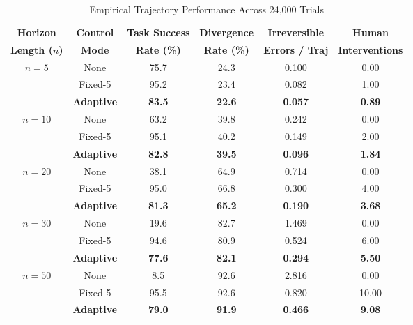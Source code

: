 \documentclass[conference]{IEEEtran}
\begin{document}
\begin{table}[h]
\caption{Empirical Trajectory Performance Across 24,000 Trials}
\label{tab:empirical_results}
\centering
\scriptsize
\renewcommand{\arraystretch}{1.15}
\begin{tabular}{cccccc}
\toprule
\textbf{Horizon} & \textbf{Control} & \textbf{Task Success} & \textbf{Divergence} & \textbf{Irreversible} & \textbf{Human} \\
\textbf{Length ($n$)} & \textbf{Mode} & \textbf{Rate (\%)} & \textbf{Rate (\%)} & \textbf{Errors / Traj} & \textbf{Interventions} \\
\midrule
\multirow{3}{*}{$n = 5$} & None & 75.7 & 24.3 & 0.100 & 0.00 \\
 & Fixed-5 & 95.2 & 23.4 & 0.082 & 1.00 \\
 & \textbf{Adaptive} & \textbf{83.5} & \textbf{22.6} & \textbf{0.057} & \textbf{0.89} \\
\midrule
\multirow{3}{*}{$n = 10$} & None & 63.2 & 39.8 & 0.242 & 0.00 \\
 & Fixed-5 & 95.1 & 40.2 & 0.149 & 2.00 \\
 & \textbf{Adaptive} & \textbf{82.8} & \textbf{39.5} & \textbf{0.096} & \textbf{1.84} \\
\midrule
\multirow{3}{*}{$n = 20$} & None & 38.1 & 64.9 & 0.714 & 0.00 \\
 & Fixed-5 & 95.0 & 66.8 & 0.300 & 4.00 \\
 & \textbf{Adaptive} & \textbf{81.3} & \textbf{65.2} & \textbf{0.190} & \textbf{3.68} \\
\midrule
\multirow{3}{*}{$n = 30$} & None & 19.6 & 82.7 & 1.469 & 0.00 \\
 & Fixed-5 & 94.6 & 80.9 & 0.524 & 6.00 \\
 & \textbf{Adaptive} & \textbf{77.6} & \textbf{82.1} & \textbf{0.294} & \textbf{5.50} \\
\midrule
\multirow{3}{*}{$n = 50$} & None & 8.5 & 92.6 & 2.816 & 0.00 \\
 & Fixed-5 & 95.5 & 92.6 & 0.820 & 10.00 \\
 & \textbf{Adaptive} & \textbf{79.0} & \textbf{91.9} & \textbf{0.466} & \textbf{9.08} \\
\bottomrule
\end{tabular}
\end{table}
\end{document}
